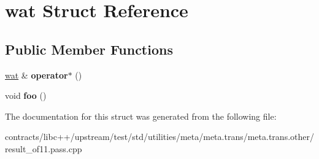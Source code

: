 \hypertarget{structwat}{}\section{wat Struct Reference}
\label{structwat}
\subsection*{Public Member Functions}
\begin{DoxyCompactItemize}
\item 
\mbox{\label{structwat_a14ce421decccfad0ed588d7ed16f7ab0}} 
\mbox{\hyperlink{structwat}{wat}} \& {\bfseries operator$\ast$} ()
\item 
\mbox{\label{structwat_a7124682a0f22960a5652d272877acc85}} 
void {\bfseries foo} ()
\end{DoxyCompactItemize}


The documentation for this struct was generated from the following file\+:\begin{DoxyCompactItemize}
\item 
contracts/libc++/upstream/test/std/utilities/meta/meta.\+trans/meta.\+trans.\+other/result\+\_\+of11.\+pass.\+cpp\end{DoxyCompactItemize}
